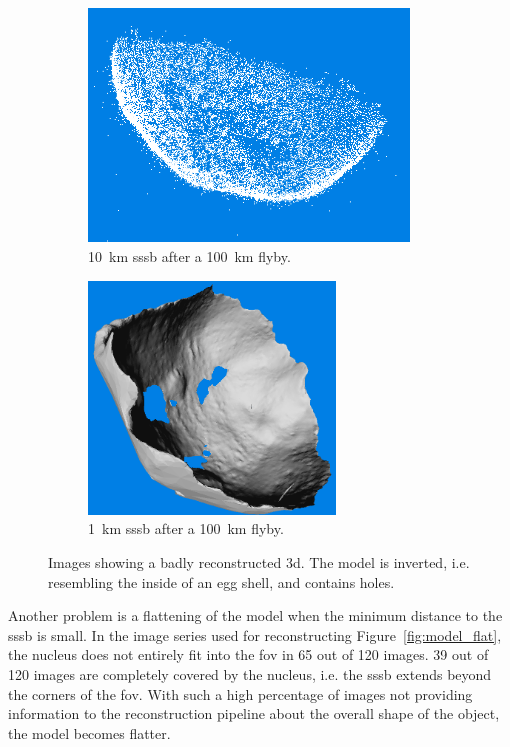 \begin{figure}[htb]
    \centering
        \begin{subfigure}[b]{0.42\textwidth}
            \centering
            \includegraphics[width=\textwidth,height=6.2cm]{doc/thesis/0_figures/models_quality/broken/broken_points1.png}
            \caption{\SI{10}{\kilo\meter} \gls{sssb} after a \SI{100}{\kilo\meter} flyby.} %
            \label{fig:models_broken_points}
        \end{subfigure}
        \begin{subfigure}[b]{0.42\textwidth}
            \centering
            \includegraphics[width=\textwidth,height=6.2cm]{doc/thesis/0_figures/models_quality/broken/broken_refine2.png}
            \caption{\SI{1}{\kilo\meter} \gls{sssb} after a \SI{100}{\kilo\meter} flyby.}
            \label{fig:models_broken_mesh}
        \end{subfigure}
    \caption{Images showing a badly reconstructed \gls{3d}. The model is inverted, i.e. resembling the inside of an egg shell, and contains holes.}
    \label{fig:models_broken}
\end{figure}

Another problem is a flattening of the model when the minimum distance to the \gls{sssb} is small. In the image series used for reconstructing Figure~\ref{fig:model_flat}, the nucleus does not entirely fit into the \gls{fov} in \SI{65}{} out of \SI{120}{} images. \SI{39}{} out of \SI{120}{} images are completely covered by the nucleus, i.e. the \gls{sssb} extends beyond the corners of the \gls{fov}. With such a high percentage of images not providing information to the reconstruction pipeline about the overall shape of the object, the model becomes flatter.

